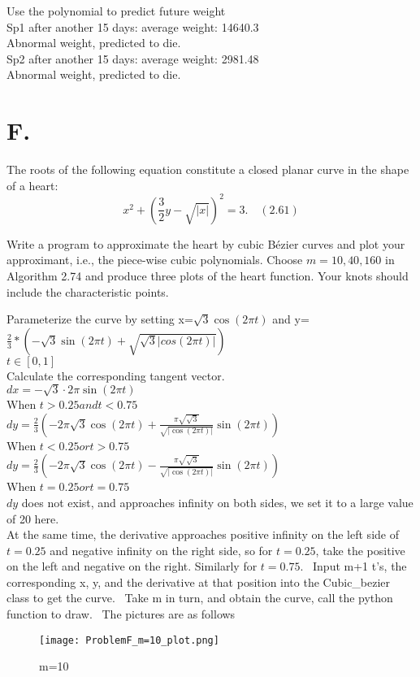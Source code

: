 \documentclass[a4paper]{article}
\begin{document}
    Use the polynomial to predict future weight \\
    Sp1 after another 15 days: average weight: 14640.3 \\
    Abnormal weight, predicted to die. \\
    Sp2 after another 15 days: average weight: 2981.48 \\
    Abnormal weight, predicted to die.
    
    \section*{F.}
    The roots of the following equation constitute a closed planar curve in the shape of a heart:
    \[
    x^2 + \left(\frac{3}{2} y - \sqrt{|x|}\right)^2 = 3. \quad (2.61)
    \]
    
    Write a program to approximate the heart by cubic Bézier curves and plot your approximant, i.e., the piece-wise cubic polynomials. Choose $m = 10, 40, 160$ in Algorithm 2.74 and produce three plots of the heart function. Your knots should include the characteristic points.
    
    Parameterize the curve by setting x=$\sqrt{3}\cos(2\pi t)$ and y=$\frac{2}{3}*(-\sqrt{3}\sin(2\pi t)+\sqrt{\sqrt{3}|cos(2\pi t)|})$ \\
    $t \in [0,1]$ \\
    Calculate the corresponding tangent vector. \\
    $dx=-\sqrt{3} \cdot 2\pi\sin(2\pi t)$ \\
    When $t>0.25 and t<0.75$ \\
    $dy = \frac{2}{3} \left( -2\pi\sqrt{3}\cos(2\pi t) + \frac{\pi\sqrt{\sqrt{3}}}{\sqrt{|\cos(2\pi t)|}}\sin(2\pi t) \right)$ \\
    When $t<0.25 or t>0.75$ \\
    $dy = \frac{2}{3} \left( -2\pi\sqrt{3}\cos(2\pi t) - \frac{\pi\sqrt{\sqrt{3}}}{\sqrt{|\cos(2\pi t)|}}\sin(2\pi t) \right)$ \\
    When $t=0.25 or t=0.75$ \\
    $dy$ does not exist, and approaches infinity on both sides, we set it to a large value of 20 here. \\
    At the same time, the derivative approaches positive infinity on the left side of $t=0.25$ and negative infinity on the right side, so for $t=0.25$, take the positive on the left and negative on the right. Similarly for $t=0.75$. \
    Input m+1 t's, the corresponding x, y, and the derivative at that position into the Cubic\_bezier class to get the curve. \
    Take m in turn, and obtain the curve, call the python function to draw. \
    The pictures are as follows \
    \begin{figure}[H]
        \centering
        \texttt{[image: ProblemF\_m=10\_plot.png]}
        \caption{m=10}
    \end{figure}
    
\end{document}
